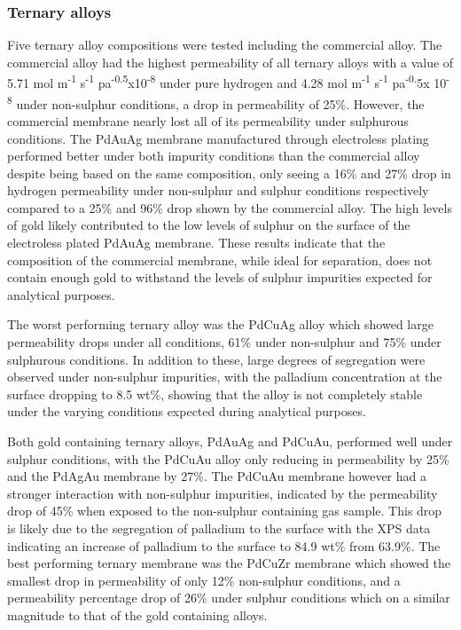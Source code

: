 \subsubsection{Ternary alloys}
Five ternary alloy compositions were tested including the commercial alloy. The commercial alloy had the highest permeability of all ternary alloys with a value of 5.71 mol m\textsuperscript{-1} s\textsuperscript{-1} pa\textsuperscript{-0.5}x10\textsuperscript{-8} under pure hydrogen and 4.28 mol m\textsuperscript{-1} s\textsuperscript{-1} pa\textsuperscript{-0.}5x 10\textsuperscript{-8}  under non-sulphur conditions, a drop in permeability of 25\%. However, the commercial membrane nearly lost all of its permeability under sulphurous conditions. The PdAuAg membrane manufactured through electroless plating performed better under both impurity conditions than the commercial alloy despite being based on the same composition, only seeing a 16\% and 27\% drop in hydrogen permeability under non-sulphur and sulphur conditions respectively compared to a 25\% and 96\% drop shown by the commercial alloy. The high levels of gold likely contributed to the low levels of sulphur on the surface of the electroless plated PdAuAg membrane. These results indicate that the composition of the commercial membrane, while ideal for separation, does not contain enough gold to withstand the levels of sulphur impurities expected for analytical purposes. 

The worst performing ternary alloy was the PdCuAg alloy which showed large permeability drops under all conditions, 61\% under non-sulphur and 75\% under sulphurous conditions. In addition to these, large degrees of segregation were observed under non-sulphur impurities, with the palladium concentration at the surface dropping to 8.5 wt\%, showing that the alloy is not completely stable under the varying conditions expected during analytical purposes.  

Both gold containing ternary alloys, PdAuAg and PdCuAu, performed well under sulphur conditions, with the PdCuAu alloy only reducing in permeability by 25\% and the PdAgAu membrane by 27\%. The PdCuAu membrane however had a stronger interaction with non-sulphur impurities, indicated by the permeability drop of 45\% when exposed to the non-sulphur containing gas sample. This drop is likely due to the segregation of palladium to the surface with the XPS data indicating an increase of palladium to the surface to 84.9 wt\% from 63.9\%. The best performing ternary membrane was the PdCuZr membrane which showed the smallest drop in permeability of only 12\% non-sulphur conditions, and a permeability percentage drop of 26\% under sulphur conditions which on a similar magnitude to that of the gold containing alloys.

